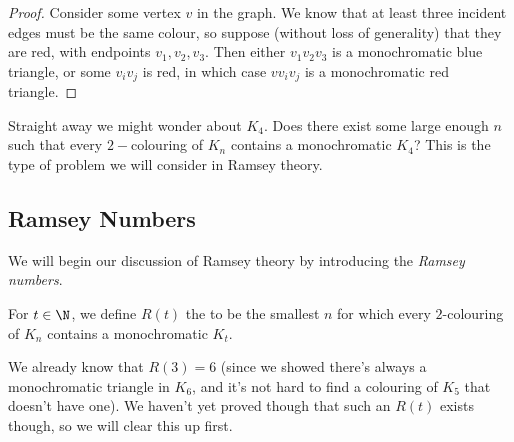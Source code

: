 \documentclass[a4paper]{scrartcl}
\begin{document}
\begin{proof}
	Consider some vertex $v$ in the graph. We know that at least three incident edges must be the same colour, so suppose (without loss of generality) that they are red, with endpoints $v_1, v_2, v_3$. Then either $v_1 v_2 v_3$ is a monochromatic blue triangle, or some $v_i v_j$ is red, in which case $v v_i v_j$ is a monochromatic red triangle.
\end{proof}

Straight away we might wonder about $K_4$. Does there exist some large enough $n$ such that every $2-$colouring of $K_n$ contains a monochromatic $K_4$? This is the type of problem we will consider in Ramsey theory.


\subsection{Ramsey Numbers}

We will begin our discussion of Ramsey theory by introducing the \emph{Ramsey numbers}.

\begin{definition}
	For $t \in \N$, we define $R(t)$ the  to be the smallest $n$ for which every $2$-colouring of $K_n$ contains a monochromatic $K_t$.
\end{definition}

We already know that $R(3) = 6$ (since we showed there's always a monochromatic triangle in $K_6$, and it's not hard to find a colouring of $K_5$ that doesn't have one). We haven't yet proved though that such an $R(t)$ exists though, so we will clear this up first.
\end{document}
